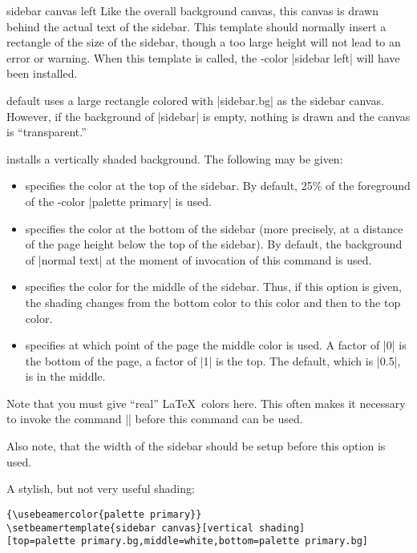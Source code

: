 \begin{element}{sidebar canvas left}\yes\no\no
  Like the overall background canvas, this canvas is drawn behind the
  actual text of the sidebar. This template should normally insert a
  rectangle of the size of the sidebar, though a too large height will
  not lead to an error or warning. When this template is called, the
  \beamer-color |sidebar left| will have been installed.

  \begin{templateoptions}
  \item{default}{}
    uses a large rectangle colored with |sidebar.bg| as the sidebar
    canvas. However, if the background of |sidebar| is empty, nothing
    is drawn and the canvas is ``transparent.''
    
    installs a vertically shaded background. The following
     may be given:
    \begin{itemize}
    \item {} specifies the color at the
      top of the sidebar. By default, 25\% of the foreground of the
      \beamer-color |palette primary| is used.
    \item {} specifies the color at the
      bottom of the sidebar (more precisely, at a distance of the page
      height below the top of the sidebar). By default, the background of
      |normal text| at the moment of invocation of this command is
      used. 
    \item {} specifies the color
      for the middle of the sidebar. Thus, if this option is given, the
      shading changes from the bottom color to this color and then
      to the top color.
    \item {} specifies at which
      point of the page the middle color is used. A factor of |0| is
      the bottom of the page, a factor of |1| is the top. The
      default, which is |0.5|, is in the middle.
    \end{itemize}
    Note that you must give ``real'' \LaTeX\ colors here. This often
    makes it necessary to invoke the command |\usebeamercolor| before
    this command can be used.

    Also note, that the width of the sidebar should be setup before
    this option is used.

    \example A stylish, but not very useful shading:
\begin{verbatim}
{\usebeamercolor{palette primary}}
\setbeamertemplate{sidebar canvas}[vertical shading]
[top=palette primary.bg,middle=white,bottom=palette primary.bg]
\end{verbatim}
    

\end{templateoptions}
\end{element}
